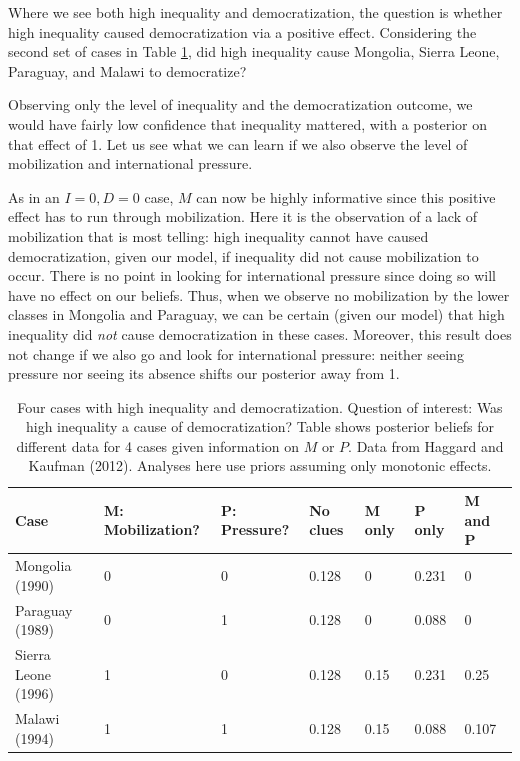 \documentclass[
  12pt,
]{book}
\begin{document}
Where we see both high inequality and democratization, the question is whether high inequality caused democratization via a positive effect. Considering the second set of cases in Table \ref{tab:HK8cases2}, did high inequality cause Mongolia, Sierra Leone, Paraguay, and Malawi to democratize?

Observing only the level of inequality and the democratization outcome, we would have fairly low confidence that inequality mattered, with a posterior on that effect of 1. Let us see what we can learn if we also observe the level of mobilization and international pressure.

As in an \(I=0, D=0\) case, \(M\) can now be highly informative since this positive effect has to run through mobilization. Here it is the observation of a lack of mobilization that is most telling: high inequality cannot have caused democratization, given our model, if inequality did not cause mobilization to occur. There is no point in looking for international pressure since doing so will have no effect on our beliefs. Thus, when we observe no mobilization by the lower classes in Mongolia and Paraguay, we can be certain (given our model) that high inequality did \emph{not} cause democratization in these cases. Moreover, this result does not change if we also go and look for international pressure: neither seeing pressure nor seeing its absence shifts our posterior away from 1.

\begin{table}

\caption{\label{tab:HK8cases2}Four cases with high inequality and  democratization. Question of interest: Was high inequality a cause of democratization? Table shows posterior beliefs for different data for 4 cases given information on $M$ or $P$. Data from Haggard and Kaufman (2012). Analyses here use priors assuming only monotonic effects.}
\centering
\begin{tabular}[t]{l|l|l|l|l|l|l}
\hline
Case & M: Mobilization? & P: Pressure? & No clues & M only & P only & M and P\\
\hline
Mongolia (1990) & 0 & 0 & 0.128 & 0 & 0.231 & 0\\
\hline
Paraguay (1989) & 0 & 1 & 0.128 & 0 & 0.088 & 0\\
\hline
Sierra Leone (1996) & 1 & 0 & 0.128 & 0.15 & 0.231 & 0.25\\
\hline
Malawi (1994) & 1 & 1 & 0.128 & 0.15 & 0.088 & 0.107\\
\hline
\end{tabular}
\end{table}
\end{document}
